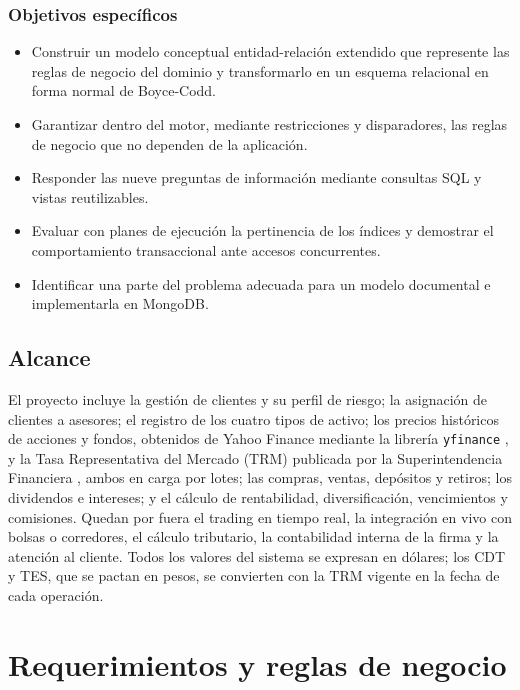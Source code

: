 \documentclass[10pt,letterpaper]{article}
\renewcommand{\_}{\oldUS\allowbreak}
\begin{document}
\subsubsection{Objetivos específicos}

\begin{itemize}
  \item Construir un modelo conceptual entidad-relación extendido que represente las reglas de negocio del dominio y transformarlo en un esquema relacional en forma normal de Boyce-Codd.
  \item Garantizar dentro del motor, mediante restricciones y disparadores, las reglas de negocio que no dependen de la aplicación.
  \item Responder las nueve preguntas de información mediante consultas SQL y vistas reutilizables.
  \item Evaluar con planes de ejecución la pertinencia de los índices y demostrar el comportamiento transaccional ante accesos concurrentes.
  \item Identificar una parte del problema adecuada para un modelo documental e implementarla en MongoDB.
\end{itemize}

\subsection{Alcance}

El proyecto incluye la gestión de clientes y su perfil de riesgo; la asignación de clientes a asesores; el registro de los cuatro tipos de activo; los precios históricos de acciones y fondos, obtenidos de Yahoo Finance mediante la librería \texttt{yfinance} \citep{yfinance}, y la Tasa Representativa del Mercado (TRM) publicada por la Superintendencia Financiera \citep{trm}, ambos en carga por lotes; las compras, ventas, depósitos y retiros; los dividendos e intereses; y el cálculo de rentabilidad, diversificación, vencimientos y comisiones. Quedan por fuera el trading en tiempo real, la integración en vivo con bolsas o corredores, el cálculo tributario, la contabilidad interna de la firma y la atención al cliente. Todos los valores del sistema se expresan en dólares; los CDT y TES, que se pactan en pesos, se convierten con la TRM vigente en la fecha de cada operación.

\section{Requerimientos y reglas de negocio}
\end{document}
